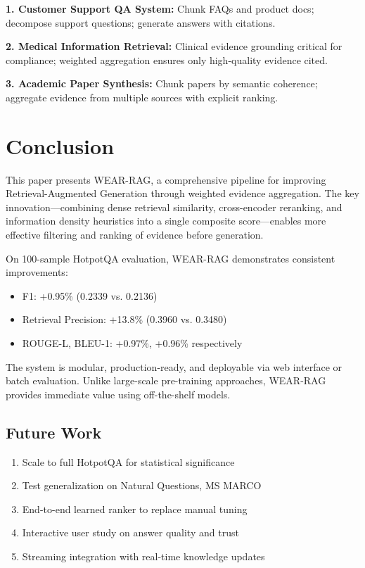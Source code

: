 \documentclass[twocolumn,11pt]{article}
\begin{document}
\textbf{1. Customer Support QA System:} Chunk FAQs and product docs; decompose support questions; generate answers with citations.

\textbf{2. Medical Information Retrieval:} Clinical evidence grounding critical for compliance; weighted aggregation ensures only high-quality evidence cited.

\textbf{3. Academic Paper Synthesis:} Chunk papers by semantic coherence; aggregate evidence from multiple sources with explicit ranking.

\section{Conclusion}

This paper presents WEAR-RAG, a comprehensive pipeline for improving Retrieval-Augmented Generation through weighted evidence aggregation. The key innovation---combining dense retrieval similarity, cross-encoder reranking, and information density heuristics into a single composite score---enables more effective filtering and ranking of evidence before generation.

On 100-sample HotpotQA evaluation, WEAR-RAG demonstrates consistent improvements:
\begin{itemize}
\item F1: +0.95\% (0.2339 vs. 0.2136)
\item Retrieval Precision: +13.8\% (0.3960 vs. 0.3480)
\item ROUGE-L, BLEU-1: +0.97\%, +0.96\% respectively
\end{itemize}

The system is modular, production-ready, and deployable via web interface or batch evaluation. Unlike large-scale pre-training approaches, WEAR-RAG provides immediate value using off-the-shelf models.

\subsection{Future Work}

\begin{enumerate}
\item Scale to full HotpotQA for statistical significance
\item Test generalization on Natural Questions, MS MARCO
\item End-to-end learned ranker to replace manual tuning
\item Interactive user study on answer quality and trust
\item Streaming integration with real-time knowledge updates
\end{enumerate}
\end{document}
